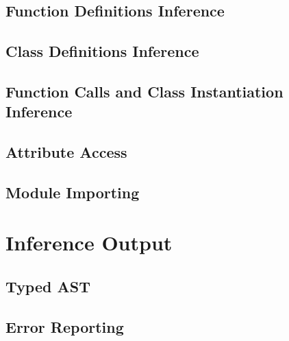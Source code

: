 \subsection{Function Definitions Inference}
\subsection{Class Definitions Inference}
\subsection{Function Calls and Class Instantiation Inference}
\subsection{Attribute Access}
\subsection{Module Importing}

\section{Inference Output}
\subsection{Typed AST}
\subsection{Error Reporting}